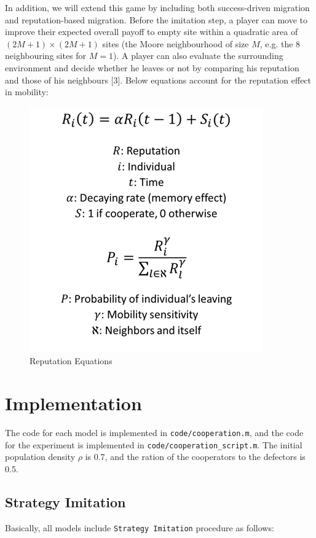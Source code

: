 \documentclass[11pt]{article}
\begin{document}
In addition, we will extend this game by including both success-driven migration and reputation-based migration. Before the imitation step, a player can move to improve their expected overall payoff to empty site within a quadratic area of $(2M+1) \times (2M+1)$ sites (the Moore neighbourhood of size $M$, e.g. the 8 neighbouring sites for $M = 1$). A player can also evaluate the surrounding environment and decide whether he leaves or not by comparing his reputation and those of his neighbours [3]. Below equations account for the reputation effect in mobility:

\begin{figure}[!htbp]
	\centering
	\includegraphics[scale=0.7]{../../other/reputation_eq.png}
    \caption{Reputation Equations}
    \label{fig:reputationeq}
\end{figure}



\section{Implementation}
The code for each model is implemented in \verb|code/cooperation.m|, and the code for the experiment is implemented in \verb|code/cooperation_script.m|. The initial population density $\rho$ is 0.7, and the ration of the cooperators to the defectors is 0.5.

\subsection{Strategy Imitation}
Basically, all models include \verb|Strategy Imitation| procedure as follows:
\end{document}
